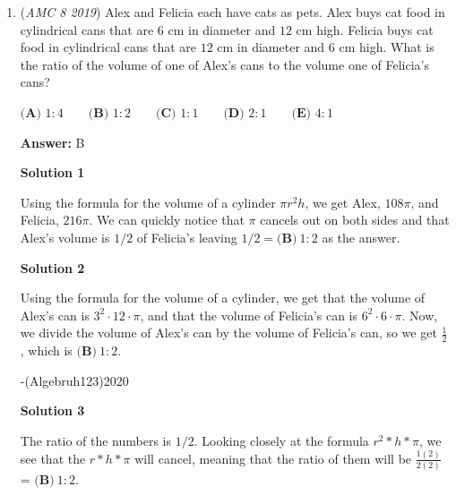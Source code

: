 \begin{enumerate}
 \textbf{Final Percentage}

 Since Gilda is left with \(54\) marbles out of her original \(100\), she has \(54\%\) of her original bag of marbles left for herself.

 \textbf{Alternative Algebraic Method}

 You can also calculate the remaining fraction directly by multiplying what stays in the bag at each step:• After Pedro, she keeps \(80\%\) (\(0.8\)).• After Ebony, she keeps \(90\%\) (\(0.9\)) of that remainder.• After Jimmy, she keeps \(75\%\) (\(0.75\)) of that remainder.\(\text{Final Percentage}=0.8\times 0.9\times 0.75=0.54=\mathbf{54\%}\) or $\boxed{\textbf{(E)}\ 54}$~Aarnavisthebest

 


	\item (\textit{AMC 8 2019}) Alex and Felicia each have cats as pets. Alex buys cat food in cylindrical cans that are $6$ cm in diameter and $12$ cm high. Felicia buys cat food in cylindrical cans that are $12$ cm in diameter and $6$ cm high. What is the ratio of the volume of one of Alex's cans to the volume one of Felicia's cans?


 $\textbf{(A) }1:4\qquad\textbf{(B) }1:2\qquad\textbf{(C) }1:1\qquad\textbf{(D) }2:1\qquad\textbf{(E) }4:1$

 \textbf{Answer: }B



\textbf{Solution 1}

Using the formula for the volume of a cylinder $\pi r^2 h$, we get Alex, $108\pi$, and Felicia, $216\pi$. We can quickly notice that $\pi$ cancels out on both sides and that Alex's volume is $1/2$ of Felicia's leaving $1/2 = \boxed{\textbf{(B)}\ 1:2}$ as the answer. 

 



\textbf{Solution 2}

Using the formula for the volume of a cylinder, we get that the volume of Alex's can is $3^2\cdot12\cdot\pi$, and that the volume of Felicia's can is $6^2\cdot6\cdot\pi$. Now, we divide the volume of Alex's can by the volume of Felicia's can, so we get $\frac{1}{2}$, which is $\boxed{\textbf{(B)}\ 1:2}$.    

 -(Algebruh123)2020

 



\textbf{Solution 3}

The ratio of the numbers is $1/2$. Looking closely at the formula $r^2 * h * \pi$, we see that the $r * h * \pi$ will cancel, meaning that the ratio of them will be $\frac{1(2)}{2(2)}$ = $\boxed{\textbf{(B)}\ 1:2}$.


\end{enumerate}
